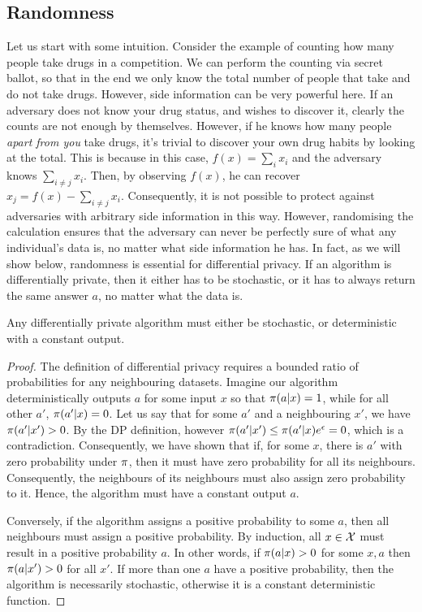 \begin{frame}
{\subsection{Randomness}  
    Let us start with some intuition. Consider the example of counting how many people take drugs in a competition. We can perform the counting via secret ballot, so that in the end we only know the total number of people that take and do not take drugs. However, side information can be very powerful here.  If an adversary does not know your drug status, and wishes to discover it, clearly the counts are not enough by themselves. However, if he knows how many people \emph{apart from you} take drugs, it's trivial to discover your own drug habits by looking at the total. This is because in this case, $f(x) = \sum_i x_i$ and the adversary knows $\sum_{i \neq j} x_i$. Then, by observing $f(x)$, he can recover $x_j = f(x) - \sum_{i \neq j} x_i$. Consequently, it is not possible to protect against adversaries with arbitrary side information in this way. However, randomising the calculation ensures that the adversary can never be perfectly sure of what any individual's data is, no matter what side information he has. In fact, as we will show below, randomness is essential for differential privacy. If an algorithm is differentially private, then it either has to be stochastic, or it has to always return the same answer $a$, no matter what the data is.
\begin{remark}
      Any differentially private algorithm must either be stochastic, or deterministic with a constant output.
    \end{remark}
    \begin{proof}
    The definition of differential privacy requires a bounded ratio of probabilities for any neighbouring datasets. Imagine our algorithm deterministically outputs $a$ for some input $x$ so that $\pi(a|x) = 1$, while for all other $a'$, $\pi(a' | x) = 0$. Let us say that for some $a'$ and a neighbouring $x'$, we have $\pi(a' | x') > 0$. By the DP definition, however $\pi(a' | x') \leq \pi(a' | x) e^{\epsilon} = 0$, which is a contradiction. Consequently, we have shown that if, for some $x$, there is $a'$ with zero probability under $\pi$, then it must have zero probability for all its neighbours. Consequently, the neighbours of its neighbours must also assign zero probability to it. Hence, the algorithm must have a constant output $a$.

    Conversely, if the algorithm assigns a positive probability to some $a$, then all neighbours must assign a positive probability. By induction, all $x \in {\mathcal{X}}$ must result in a positive probability $a$. In other words, if $\pi(a | x) > 0$ for some $x,a$ then $\pi(a | x') > 0$ for all $x'$. If more than one $a$ have a positive probability, then the algorithm is necessarily stochastic, otherwise it is a constant deterministic function.
    \end{proof}
  }
\end{frame}


